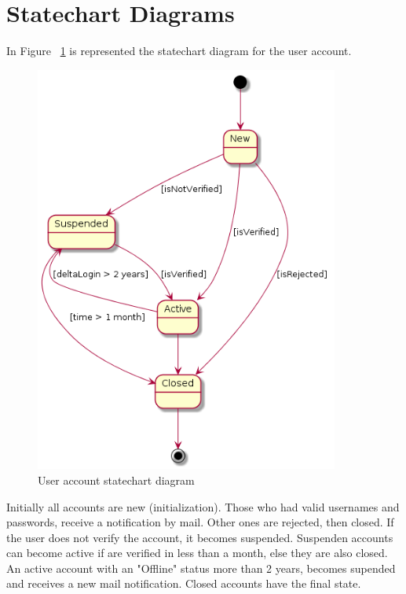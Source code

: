 \documentclass[12pt,a4paper,titlepage]{article}
\begin{document}
\section{Statechart Diagrams}
In Figure ~\ref{fig:userAccount} is represented the statechart diagram for the user account.
\begin{figure}[H]
\centering
	\includegraphics[width=10cm]{userAccount}
	\caption{User account statechart diagram}
	\label{fig:userAccount}
\end{figure}
Initially all accounts are new (initialization). Those who had valid usernames and passwords, receive a notification by mail. Other ones are rejected, then closed. If the user does not verify the account, it becomes suspended. Suspenden accounts can become active if are verified in less than a month, else they are also closed. An active account with an "Offline" status more than 2 years, becomes supended and receives a new mail notification. Closed accounts have the final state.
\end{document}
